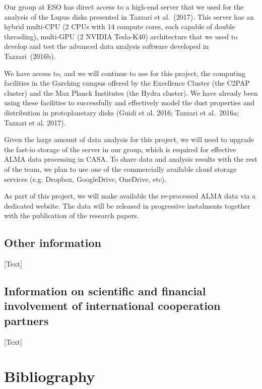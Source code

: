 \documentclass[10pt,fleqn,twoside]{article}
\newcommand{\Tcol}{\color{blue}}
\begin{document}
Our group at ESO has direct access to a high-end server that we used for the analysis of the Lupus disks presented in Tazzari et al.~(2017). This server has an hybrid multi-CPU (2 CPUs with 14 compute cores, each capable of double threading), multi-GPU (2 NVIDIA Tesla-K40) architecture that we used to develop and test the advanced data analysis software developed in Tazzari~(2016b). 

We have access to, and we will continue to use for this project, the computing facilities in the Garching campus offered by the Excellence Cluster (the C2PAP cluster) and the Max Planck Institutes (the Hydra cluster). We have already been using these facilities to successfully and effectively model the dust properties and distribution in protoplanetary disks (Guidi et al. 2016; Tazzari et al.~2016a; Tazzari et al. 2017).

Given the large amount of data analysis for this project, we will need to upgrade the fast-io storage of the server in our group, which is required for effective ALMA data processing in CASA. To share data and analysis results with the rest of the team, we plan to use one of the commercially available cloud storage services (e.g. Dropbox, GoogleDrive, OneDrive, etc). 

As part of this project, we will make available the re-processed ALMA data via a dedicated website. The data will be released in progressive instalments together with the publication of the research papers.

\subsection{\Tcol Other information}

[Text]

\subsection{\Tcol Information on scientific and financial involvement of international cooperation partners}

[Text]

\section{\Tcol Bibliography}
\end{document}
